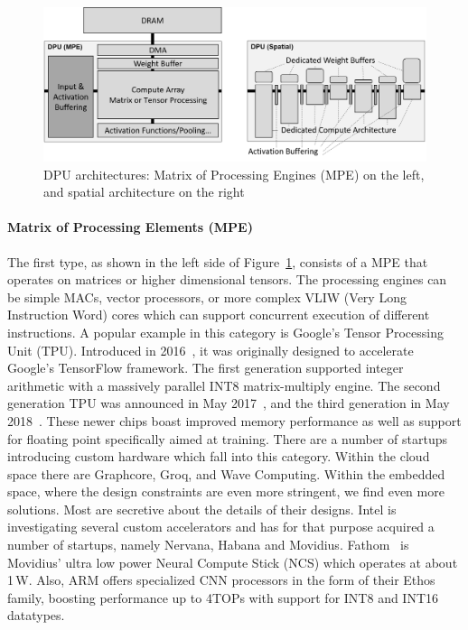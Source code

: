 \begin{figure}[h!]
\centering
\includegraphics[width=0.8\linewidth]{figures/DParchitecturesv2.png}
\caption{DPU architectures: Matrix of Processing Engines (MPE) on the left, and spatial architecture on the right}
\label{fig:dpu}
\end{figure}

\paragraph*{Matrix of Processing Elements (MPE)} The first type, as shown in the left side of Figure~\ref{fig:dpu}, consists of a MPE that operates on matrices or higher dimensional tensors. The processing engines can be simple MACs, vector processors, or more complex VLIW (Very Long Instruction Word) cores which can support concurrent execution of different instructions.
A popular example in this category is Google's Tensor Processing Unit (TPU).  
Introduced in 2016~\cite{tpu1}, it was originally designed to accelerate Google's TensorFlow framework.
The first generation supported integer arithmetic with a massively parallel INT8 matrix-multiply engine.
The second generation TPU was announced in May 2017~\cite{tpu}, and the third generation in May 2018~\cite{tpu3}.
These newer chips boast improved memory performance as well as support for floating point specifically aimed at training.  
There are a number of startups introducing custom hardware which fall into this category.
Within the cloud space there are Graphcore, Groq, and Wave Computing.
Within the embedded space, where the design constraints are even more stringent, we find even more solutions. %
Most are secretive about the details of their designs. Intel is investigating several custom accelerators and has for that purpose acquired a number of startups, namely Nervana, Habana and Movidius. Fathom~\cite{movidius-tom} is Movidius' ultra low power Neural Compute Stick (NCS) which operates at about 1\,W.  
Also, ARM offers specialized CNN processors in the form of their Ethos family, boosting performance up to 4TOPs with support for INT8 and INT16 datatypes.

